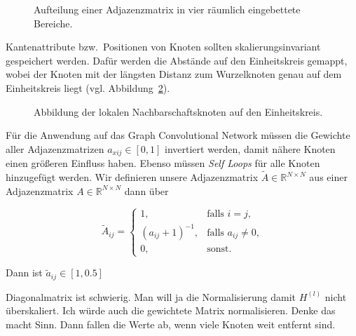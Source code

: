 \begin{figure}
{
  }
\caption{Aufteilung einer Adjazenzmatrix in vier räumlich eingebettete Bereiche.}
\label{adjazenz_aufteilung}
\end{figure}

Kantenattribute bzw.\ Positionen von Knoten sollten skalierungsinvariant gespeichert werden.
Dafür werden die Abstände auf den Einheitskreis gemappt, wobei der Knoten mit der längsten Distanz zum Wurzelknoten genau auf dem Einheitskreis liegt (vgl. Abbildung~\ref{einheitskreis}).

\begin{figure}
\caption{Abbildung der lokalen Nachbarschaftsknoten auf den Einheitskreis.}
\label{einheitskreis}
\end{figure}

Für die Anwendung auf das Graph Convolutional Network müssen die Gewichte aller Adjazenzmatrizen $a_{xij} \in [0, 1]$ invertiert werden, damit nähere Knoten einen größeren Einfluss haben.
Ebenso müssen \emph{Self Loops} für alle Knoten hinzugefügt werden.
Wir definieren unsere Adjazenzmatrix $\tilde A \in \mathbb{R}^{N \times N}$ aus einer Adjazenzmatrix $A \in \mathbb{R}^{N \times N}$ dann über

\begin{equation}
  \tilde A_{ij} = \begin{cases}
    1, & \text{falls }i=j\text{,}\\
    {(a_{ij}+1)}^{-1}, & \text{falls }a_{ij} \neq 0\text{,}\\
    0, & \text{sonst.}
  \end{cases}
\end{equation}

Dann ist $\tilde a_{ij} \in [1, 0.5]$

Diagonalmatrix ist schwierig.
Man will ja die Normalisierung damit $H^{(l)}$ nicht überskaliert.
Ich würde auch die gewichtete Matrix normalisieren.
Denke das macht Sinn.
Dann fallen die Werte ab, wenn viele Knoten weit entfernt sind.
